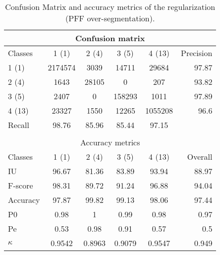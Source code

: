 \begin{table}[H]
\begin{center}
\footnotesize
\begin{tabular}{|l|c|c|c|c|r|}
\hline
\multicolumn{6}{|c|}{Confusion matrix} \\
\hline
 Classes & 1 (1) & 2 (4) & 3 (5) & 4 (13) & Precision \\
\hline
1 (1) & 2174574 & 3039 & 14711 & 29684 & 97.87 \\
\hline
2 (4) & 1643 & 28105 & 0 & 207 & 93.82 \\
\hline
3 (5) & 2407 & 0 & 158293 & 1011 & 97.89 \\
\hline
4 (13) & 23327 & 1550 & 12265 & 1055208 & 96.6 \\
\hline
Recall & 98.76 & 85.96 & 85.44 & 97.15 &  \\
\hline
\multicolumn{6}{c}{ } \\
\hline
\multicolumn{6}{|c|}{Accuracy metrics} \\
\hline
 Classes & 1 (1) & 2 (4) & 3 (5) & 4 (13) & Overall \\
\hline
IU & 96.67 & 81.36 & 83.89 & 93.94 & 88.97 \\
\hline
F-score & 98.31 & 89.72 & 91.24 & 96.88 & 94.04 \\
\hline
Accuracy & 97.87 & 99.82 & 99.13 & 98.06 & 97.44 \\
\hline
P0 & 0.98 & 1 & 0.99 & 0.98 & 0.97 \\
\hline
Pe & 0.53 & 0.98 & 0.91 & 0.57 & 0.5 \\
\hline
$\kappa$ & 0.9542 & 0.8963 & 0.9079 & 0.9547 & 0.949 \\
\hline
\end{tabular}
\caption{Confusion Matrix and accuracy metrics of the regularization (PFF over-segmentation).}
\label{table:}
\end{center}
\end{table}
